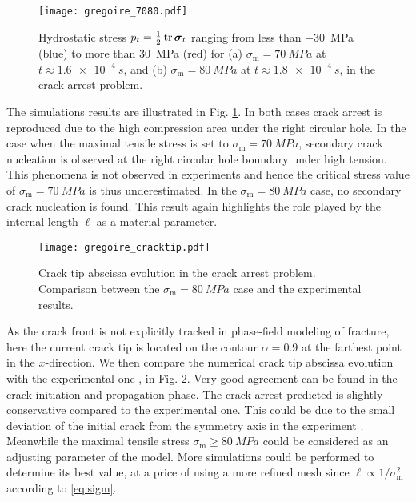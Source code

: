 \begin{figure}[htbp]
\centering
\texttt{[image: gregoire\_7080.pdf]}
\caption{Hydrostatic stress $p_t=\frac{1}{2}\tr\sig_t$ ranging from less than \SI{-30}{MPa} (blue) to more than \SI{30}{MPa} (red) for (a) $\sigma_\mathrm{m}=\SI{70}{MPa}$ at $t\approx\SI{1.6e-4}{s}$, and (b) $\sigma_\mathrm{m}=\SI{80}{MPa}$ at $t\approx\SI{1.8e-4}{s}$, in the crack arrest problem.} \label{fig:siggregoire}
\end{figure}

The simulations results are illustrated in Fig. \ref{fig:siggregoire}. In both cases crack arrest is reproduced due to the high compression area under the right circular hole. In the case when the maximal tensile stress is set to $\sigma_\mathrm{m}=\SI{70}{MPa}$, secondary crack nucleation is observed at the right circular hole boundary under high tension. This phenomena is not observed in experiments and hence the critical stress value of $\sigma_\mathrm{m}=\SI{70}{MPa}$ is thus underestimated. In the $\sigma_\mathrm{m}=\SI{80}{MPa}$ case, no secondary crack nucleation is found. This result again highlights the role played by the internal length $\ell$ as a material parameter.
\begin{figure}[htbp]
\centering
\texttt{[image: gregoire\_cracktip.pdf]}
\caption{Crack tip abscissa evolution in the crack arrest problem. Comparison between the $\sigma_\mathrm{m}=\SI{80}{MPa}$ case and the experimental results.} \label{fig:cracktip}
\end{figure}

As the crack front is not explicitly tracked in phase-field modeling of fracture, here the current crack tip is located on the contour $\alpha=0.9$ at the farthest point in the $x$-direction. We then compare the numerical crack tip abscissa evolution with the experimental one \cite{HaboussaGregoireElguedjMaigreCombescure:2011}, in Fig. \ref{fig:cracktip}. Very good agreement can be found in the crack initiation and propagation phase. The crack arrest predicted is slightly conservative compared to the experimental one. This could be due to the small deviation of the initial crack from the symmetry axis in the experiment \cite{HaboussaGregoireElguedjMaigreCombescure:2011}. Meanwhile the maximal tensile stress $\sigma_\mathrm{m}\geq\SI{80}{MPa}$ could be considered as an adjusting parameter of the model. More simulations could be performed to determine its best value, at a price of using a more refined mesh since $\ell\propto1/\sigma_\mathrm{m}^2$ according to \eqref{eq:sigm}.

